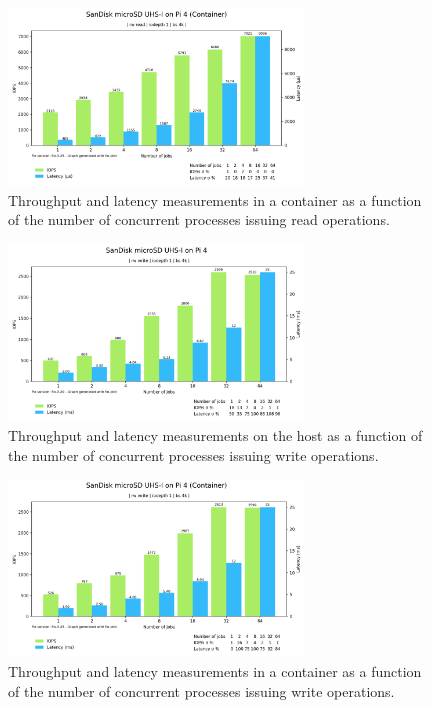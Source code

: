 \begin{figure}[H]
    \centering
    \includegraphics[width=0.7\textwidth]{images/results/sandisk-libaio-read-numjobs-iops-latency.png}
    \caption{Throughput and latency measurements in a container as a function of the number of concurrent processes issuing read operations.}
    \label{images:experiment/sandisk-libaio-read-numjobs-iops-latency.png}
\end{figure}

\begin{figure}[H]
    \centering
    \includegraphics[width=0.7\textwidth]{images/results/sandisk-host-libaio-write-numjobs-iops-latency.png}
    \caption{Throughput and latency measurements on the host as a function of the number of concurrent processes issuing write operations.}
    \label{images:experiment/sandisk-host-libaio-write-numjobs-iops-latency.png}
\end{figure}

\begin{figure}[H]
    \centering
    \includegraphics[width=0.7\textwidth]{images/results/sandisk-libaio-write-num-jobs-iops-latency.png}
    \caption{Throughput and latency measurements in a container as a function of the number of concurrent processes issuing write operations.}
    \label{images:experiment/sandisk-libaio-write-num-jobs-iops-latency.png}
\end{figure}

